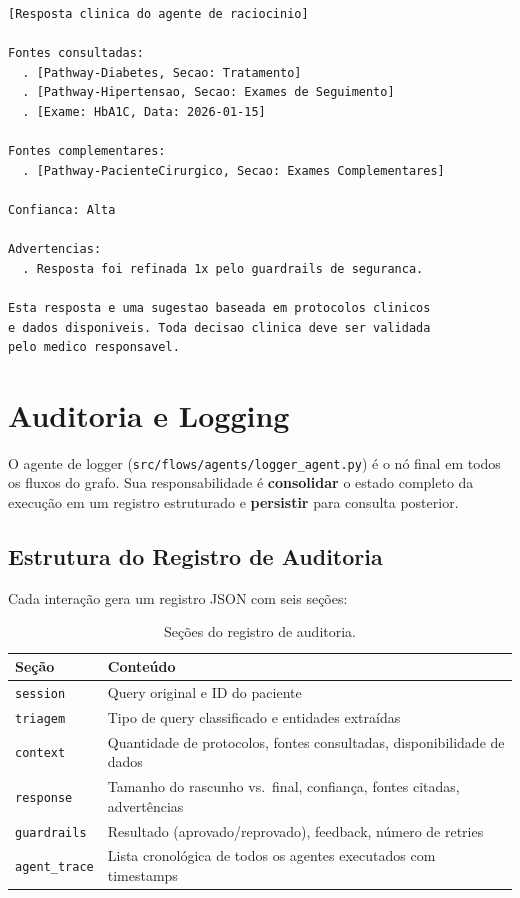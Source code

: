 \begin{lstlisting}[caption={Formato da resposta final com explicabilidade.},language={}]
[Resposta clinica do agente de raciocinio]

Fontes consultadas:
  . [Pathway-Diabetes, Secao: Tratamento]
  . [Pathway-Hipertensao, Secao: Exames de Seguimento]
  . [Exame: HbA1C, Data: 2026-01-15]

Fontes complementares:
  . [Pathway-PacienteCirurgico, Secao: Exames Complementares]

Confianca: Alta

Advertencias:
  . Resposta foi refinada 1x pelo guardrails de seguranca.

Esta resposta e uma sugestao baseada em protocolos clinicos
e dados disponiveis. Toda decisao clinica deve ser validada
pelo medico responsavel.
\end{lstlisting}

\section{Auditoria e Logging}\label{sec:auditoria}

O agente de logger (\texttt{src/flows/agents/logger\_agent.py}) é o nó final em todos os fluxos do grafo. Sua responsabilidade é \textbf{consolidar} o estado completo da execução em um registro estruturado e \textbf{persistir} para consulta posterior.

\subsection{Estrutura do Registro de Auditoria}

Cada interação gera um registro JSON com seis seções:

\begin{table}[H]
\centering
\caption{Seções do registro de auditoria.}
\label{tab:audit_sections}
\begin{tabularx}{\textwidth}{l X}
\toprule
\textbf{Seção} & \textbf{Conteúdo} \\
\midrule
\texttt{session} & Query original e ID do paciente \\
\texttt{triagem} & Tipo de query classificado e entidades extraídas \\
\texttt{context} & Quantidade de protocolos, fontes consultadas, disponibilidade de dados \\
\texttt{response} & Tamanho do rascunho vs.\ final, confiança, fontes citadas, advertências \\
\texttt{guardrails} & Resultado (aprovado/reprovado), feedback, número de retries \\
\texttt{agent\_trace} & Lista cronológica de todos os agentes executados com timestamps \\
\bottomrule
\end{tabularx}
\end{table}

